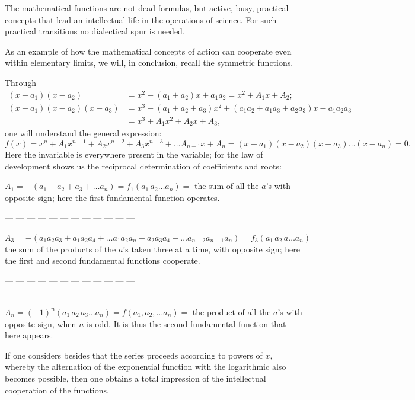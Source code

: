 \documentclass[12pt]{book}
\begin{document}
The mathematical functions are not dead formulas, but active, busy, practical
concepts that lead an intellectual life in the operations of science. For such
practical transitions no dialectical spur is needed.

As an example of how the mathematical concepts of action can cooperate even
within elementary limits, we will, in conclusion, recall the symmetric functions.

Through
\[
\begin{aligned}
(x-a_1)(x-a_2) &= x^{2} - (a_1+a_2)x + a_1a_2 = x^{2} + A_1 x + A_2;\\
(x-a_1)(x-a_2)(x-a_3) &= x^{3} - (a_1+a_2+a_3)x^{2}
   + (a_1a_2 + a_1a_3 + a_2a_3)x - a_1a_2a_3\\
&= x^{3} + A_1 x^{2} + A_2 x + A_3,
\end{aligned}
\]
one will understand the general expression:
\[
f(x) = x^{n} + A_1 x^{n-1} + A_2 x^{n-2} + A_3 x^{n-3} + \dots A_{n-1}x + A_n
   = (x-a_1)(x-a_2)(x-a_3)\dots(x-a_n) = 0.
\]
Here the invariable is everywhere present in the variable; for the law of
development shows us the reciprocal determination of coefficients and roots:

$A_1 = -(a_1+a_2+a_3+\dots a_n) = f_1(a_1\,a_2\dots a_n) = $ the sum of all the
$a$'s with opposite sign; here the first fundamental function operates.

\begin{center}--- --- --- --- --- --- --- --- --- --- --- ---\end{center}

$A_3 = -(a_1a_2a_3 + a_1a_2a_4 + \dots a_1a_2a_n + a_2a_3a_4 + \dots
a_{n-2}a_{n-1}a_n) = f_3(a_1\,a_2\,a\dots a_n) = $ the sum of the products of the
$a$'s taken three at a time, with opposite sign; here the first and second
fundamental functions cooperate.

\begin{center}--- --- --- --- --- --- --- --- --- --- --- ---\\
--- --- --- --- --- --- --- --- --- --- --- ---\end{center}

$A_n = (-1)^{n}(a_1\,a_2\,a_3\dots a_n) = f(a_1, a_2, \dots a_n) = $ the product
of all the $a$'s with opposite sign, when $n$ is odd. It is thus the second
fundamental function that here appears.

If one considers besides that the series proceeds according to powers of $x$,
whereby the alternation of the exponential function with the logarithmic also
becomes possible, then one obtains a total impression of the intellectual
cooperation of the functions.
\end{document}
